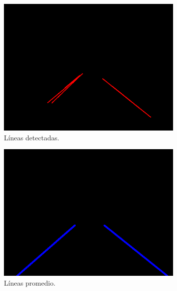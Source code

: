 \begin{figure}[h]
    \centering
    \begin{subfigure}[b]{0.3\textwidth}
         \centering
         \includegraphics[width=\textwidth]{Figures/Figures_Cap04/hough_lines.png}
         \caption{Líneas detectadas.}
         \label{fig:hough_lines}
    \end{subfigure}
    \hfill
    \begin{subfigure}[b]{0.3\textwidth}
         \centering
         \includegraphics[width=\textwidth]{Figures/Figures_Cap04/avg_hough_lines.png}
         \caption{Líneas promedio.}
         \label{fig:avg_lines}
     \end{subfigure}
     \hfill
     \begin{subfigure}[b]{0.3\textwidth}

\end{subfigure}
\end{figure}

